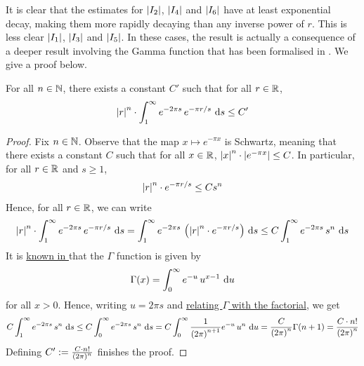 
It is clear that the estimates for $\left\lvert I_2 \right\rvert$, $\left\lvert I_4 \right\rvert$ and $\left\lvert I_6 \right\rvert$ have at least exponential decay, making them more rapidly decaying than any inverse power of $r$. This is less clear $\left\lvert I_1 \right\rvert$, $\left\lvert I_3 \right\rvert$ and $\left\lvert I_5 \right\rvert$. In these cases, the result is actually a consequence of a deeper result involving the Gamma function that has been formalised in \mathlib. We give a proof below.

\begin{boxlemma}\label{Ch4:Lemma:Bessel_Bound}
    For all $n \in \mathbb{N}$, there exists a constant $C'$ such that for all $r \in \mathbb{R}$,
    \begin{align*}
        \left\lvert r \right\rvert^n \cdot \int_{1}^{\infty} e^{-2\pi s} \, e^{-\pi r /s} \, \operatorname{d}\!{s} \leq C'
    \end{align*}
\end{boxlemma}
\begin{proof}
    Fix $n \in \mathbb{N}$. Observe that the map $x \mapsto e^{-\pi x}$ is Schwartz, meaning that there exists a constant $C$ such that for all $x \in \mathbb{R}$, $\left\lvert x \right\rvert^n \cdot \left\lvert e^{-\pi x} \right\rvert \leq C$. In particular, for all $r \in \mathbb{R}$ and $s \geq 1$,
    \begin{align*}
        \left\lvert r \right\rvert^n \cdot e^{-\pi r/s} \leq C s^n
    \end{align*}
    Hence, for all $r \in \mathbb{R}$, we can write
    \begin{align*}
        \left\lvert r \right\rvert^n \cdot \int_{1}^{\infty} e^{-2\pi s} \, e^{-\pi r /s} \, \operatorname{d}\!{s}
        = \int_{1}^{\infty} e^{-2\pi s} \, \left( \left\lvert r \right\rvert^n \cdot e^{-\pi r /s} \right) \, \operatorname{d}\!{s}
        \leq C \int_{1}^{\infty} e^{-2\pi s} \, s^n \, \operatorname{d}\!{s}
    \end{align*}
    It is \href{https://github.com/leanprover-community/mathlib4/blob/5a2eaa85c555c4263e15928cef249cbaad2eb2d2/Mathlib/Analysis/SpecialFunctions/Gamma/Basic.lean#L403}{known in \mathlib} that the $\Gamma$ function is given by
    \begin{align*}
        \Gamma(x) = \int_{0}^{\infty} e^{-u} \, u^{x-1} \, \operatorname{d}\!{u}
    \end{align*}
    for all $x > 0$. Hence, writing $u = 2\pi s$ and \href{https://github.com/leanprover-community/mathlib4/blob/5a2eaa85c555c4263e15928cef249cbaad2eb2d2/Mathlib/Analysis/SpecialFunctions/Gamma/Basic.lean#L430}{relating $\Gamma$ with the factorial}, we get
    \begin{align*}
        C \int_{1}^{\infty} e^{-2\pi s} \, s^n \, \operatorname{d}\!{s}
        \leq C \int_{0}^{\infty} e^{-2\pi s} \, s^n \, \operatorname{d}\!{s}
        = C \int_{0}^{\infty} \frac{1}{\left( 2\pi \right)^{n+1}} e^{-u} \, u^n \, \operatorname{d}\!{u}
        = \frac{C}{\left( 2\pi \right)^n} \Gamma\!\left( n + 1 \right)
        = \frac{C \cdot n!}{\left( 2\pi \right)^n}
    \end{align*}
    Defining $C' := \frac{C \cdot n!}{\left( 2\pi \right)^n}$ finishes the proof.
\end{proof}

